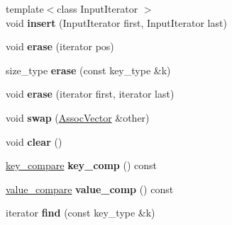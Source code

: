 \begin{DoxyCompactItemize}
\item 
\hypertarget{classLoki_1_1AssocVector_a1a80648d0dec778ee27c92faca0efb3b}{}{\footnotesize template$<$class Input\+Iterator $>$ }\\void {\bfseries insert} (Input\+Iterator first, Input\+Iterator last)\label{classLoki_1_1AssocVector_a1a80648d0dec778ee27c92faca0efb3b}

\item 
\hypertarget{classLoki_1_1AssocVector_afeb38fb81ad0c0e5ead1910c996c0e59}{}void {\bfseries erase} (iterator pos)\label{classLoki_1_1AssocVector_afeb38fb81ad0c0e5ead1910c996c0e59}

\item 
\hypertarget{classLoki_1_1AssocVector_ab9cee22525dc6e85634ba65e9546d4c2}{}size\+\_\+type {\bfseries erase} (const key\+\_\+type \&k)\label{classLoki_1_1AssocVector_ab9cee22525dc6e85634ba65e9546d4c2}

\item 
\hypertarget{classLoki_1_1AssocVector_a92e2bf63d7eb8be7e05b69920b517e88}{}void {\bfseries erase} (iterator first, iterator last)\label{classLoki_1_1AssocVector_a92e2bf63d7eb8be7e05b69920b517e88}

\item 
\hypertarget{classLoki_1_1AssocVector_a265a5b61733b4a21d09c97d8db434255}{}void {\bfseries swap} (\hyperlink{classLoki_1_1AssocVector}{Assoc\+Vector} \&other)\label{classLoki_1_1AssocVector_a265a5b61733b4a21d09c97d8db434255}

\item 
\hypertarget{classLoki_1_1AssocVector_a75c685a72ec1ed802cef9979f0e1d3b6}{}void {\bfseries clear} ()\label{classLoki_1_1AssocVector_a75c685a72ec1ed802cef9979f0e1d3b6}

\item 
\hypertarget{classLoki_1_1AssocVector_a7fce5623115eb888be2c1bf87b2f7960}{}\hyperlink{classC}{key\+\_\+compare} {\bfseries key\+\_\+comp} () const \label{classLoki_1_1AssocVector_a7fce5623115eb888be2c1bf87b2f7960}

\item 
\hypertarget{classLoki_1_1AssocVector_ac67828eaa4a6293b0dca17f20e63fd87}{}\hyperlink{classLoki_1_1AssocVector_1_1value__compare}{value\+\_\+compare} {\bfseries value\+\_\+comp} () const \label{classLoki_1_1AssocVector_ac67828eaa4a6293b0dca17f20e63fd87}

\item 
\hypertarget{classLoki_1_1AssocVector_a0e4b91866e717e64d0610157ca15f677}{}iterator {\bfseries find} (const key\+\_\+type \&k)\label{classLoki_1_1AssocVector_a0e4b91866e717e64d0610157ca15f677}


\end{DoxyCompactItemize}
